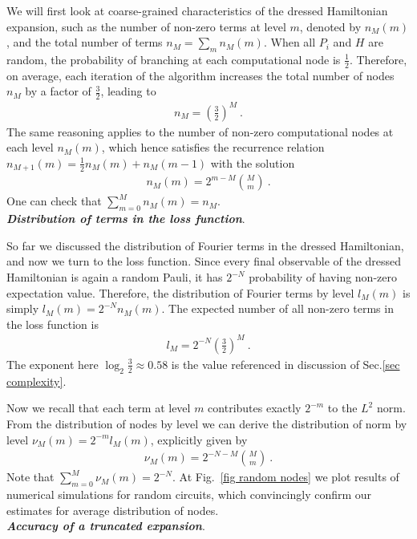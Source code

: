 \documentclass[twocolumn, amsfonts, amssymb, aps, nofootinbib]{revtex4-2}
\begin{document}
We will first look at coarse-grained characteristics of the dressed Hamiltonian expansion, such as the number of non-zero terms at level $m$, denoted by $n_M(m)$, and the total number of terms $n_M=\sum_m n_M(m)$. When all $P_i$ and $H$ are random, the probability of branching at each computational node is $\frac12$. Therefore, on average, each iteration of the algorithm increases the total number of nodes $n_M$ by a factor of $\frac32$, leading to
\begin{align}
	n_M=\left(\frac32\right)^M \ . \label{nM}
\end{align}
The same reasoning applies to the number of non-zero computational nodes at each level $n_{M}(m)$, which hence satisfies the recurrence relation $n_{M+1}(m)=\frac12 n_{M}(m)+n_{M}(m-1)$ with the solution
\begin{align}
	n_{M}(m)=2^{m-M}\binom{M}{m} \ .
\end{align}
One can check that $\sum_{m=0}^M n_{M}(m)=n_M$.
\\[4pt]
\textbf{\textit{Distribution of terms in the loss function}}.
 
So far we discussed the distribution of Fourier terms in the dressed Hamiltonian, and now we turn to the loss function. Since every final observable of the dressed Hamiltonian is again a random Pauli, it has $2^{-N}$ probability of having non-zero expectation value. Therefore, the distribution of Fourier terms by level $l_M(m)$ is simply $l_M(m)=2^{-N}n_M(m)$. The expected number of all non-zero terms in the loss function is
\begin{align}
	l_M = 2^{-N}\left(\frac32\right)^{M} \ . \label{lM}
\end{align}
The exponent here $\log_2\frac32\approx 0.58$ is the value referenced in discussion of Sec.\ref{sec complexity}.

Now we recall that each term at level $m$ contributes exactly $2^{-m}$ to the $L^2$ norm. From the distribution of nodes by level we can derive the distribution of norm by level $\nu_{M}(m)=2^{-m}l_{M}(m)$, explicitly given by
\begin{align}
	\nu_{M}(m)=2^{-N-M}\binom{M}{m} \ . \label{binom}
\end{align}
Note that $\sum_{m=0}^M \nu_{M}(m)=2^{-N}$. At Fig.~\ref{fig random nodes} we plot results of numerical simulations for random circuits, which convincingly confirm our estimates for average distribution of nodes. 
\\[4pt]
\textbf{\textit{Accuracy of a truncated expansion}}. 
\end{document}
